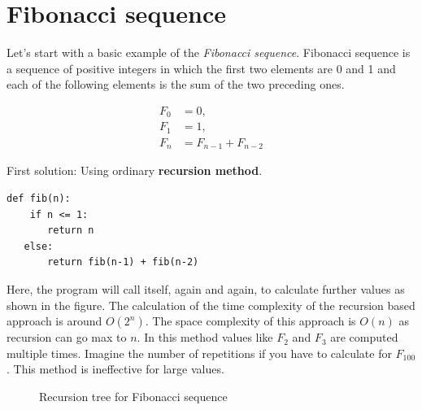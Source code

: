 \documentclass[a4paper,11pt]{book}
\begin{document}
\section{Fibonacci sequence}

\noindent Let's start with a basic example of the \textit{Fibonacci sequence}. Fibonacci sequence is a sequence of positive integers in which the first two elements are 0 and 1 and each of the following elements is the sum of the two preceding ones.

\begin{align*}
    F_0 &= 0,\\
    F_1 &= 1,\\
    F_n &= F_{n-1} + F_{n-2}
\end{align*}

\noindent First solution: Using ordinary \textbf{recursion method}.
\begin{lstlisting}
def fib(n):
    if n <= 1:
       return n
   else:
       return fib(n-1) + fib(n-2)
\end{lstlisting}

\noindent Here, the program will call itself, again and again, to calculate further values as shown in the figure. The calculation of the time complexity of the recursion based approach is around $O(2^n)$. The space complexity of this approach is $O(n)$ as recursion can go max to $n$. In this method values like $F_2$ and $F_3$ are computed multiple times. Imagine the number of repetitions if you have to calculate for $F_{100}$. This method is ineffective for large values.

\begin{figure}[ht]
\begin{center}
\end{center}
\caption{Recursion tree for Fibonacci sequence}
\end{figure}
\end{document}
